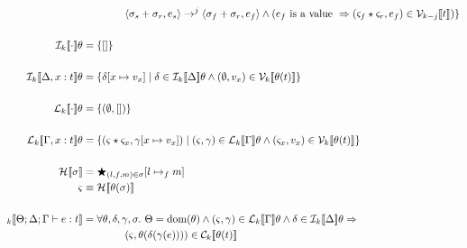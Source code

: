 \begin{align*}
               & \qquad \qquad \langle \sigma_s + \sigma_r, e_s \rangle \rightarrow^j \langle \sigma_f + \sigma_r, e_f \rangle \wedge ( e_f \textrm { is a value } \Rightarrow ( \varsigma_f \star \varsigma_r, e_f ) \in \V{k-j}{t} ) \} \\
\\
    \den{I}{k}{ \cdot } \theta &= \{ [] \} \\
\\
    \den{I}{k}{ \Delta, x : t } \theta &= \{ \delta[x \mapsto v_x ] \mid \delta \in \den{I}{k}{\Delta}\theta \wedge (\empH, v_x) \in \V{k}{\theta(t)} \} \\
\\
    \den{L}{k}{ \cdot } \theta &= \{ (\empH, []) \} \\
\\
    \den{L}{k}{ \Gamma, x : t } \theta &= \{ (\varsigma \star \varsigma_x, \gamma[x \mapsto v_x ]) \mid (\varsigma, \gamma) \in \den{L}{k}{\Gamma}\theta \wedge (\varsigma_x, v_x) \in \V{k}{\theta(t)} \} \\
\\
    \den{H}{}{\sigma} &= \bigstar_{(l,f,m) \in \sigma} [ l \mapsto_f m ]
\\
    \varsigma &\equiv \den{H}{}{\theta(\sigma)} \\
\\
\den{}{k}{ \Theta; \Delta ; \Gamma \vdash e : t } &= \forall \theta, \delta, \gamma, \sigma.\ \Theta = \dom(\theta) \wedge (\varsigma, \gamma) \in \den{L}{k}{ \Gamma }\theta \wedge \delta \in \den{I}{k}{ \Delta }\theta \Rightarrow \\
                                                     & \qquad \qquad (\varsigma, \theta(\delta(\gamma(e)))) \in \C{k}{ \theta(t) }
\end{align*}
